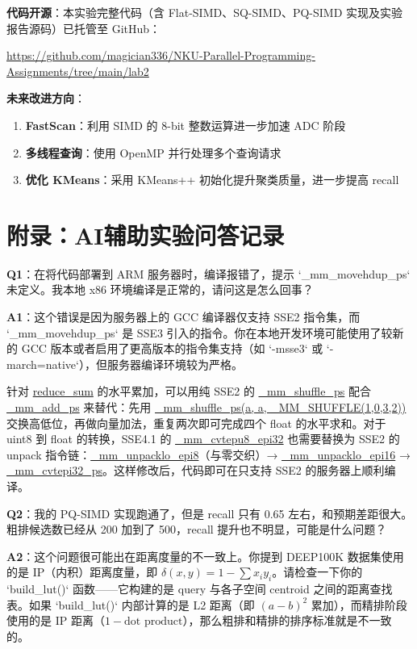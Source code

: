 \documentclass[a4paper]{article}
\begin{document}
\textbf{代码开源}：本实验完整代码（含 Flat-SIMD、SQ-SIMD、PQ-SIMD 实现及实验报告源码）已托管至 GitHub：
\begin{center}
\url{https://github.com/magician336/NKU-Parallel-Programming-Assignments/tree/main/lab2}
\end{center}

\textbf{未来改进方向}：
\begin{enumerate}
  \item \textbf{FastScan}：利用 SIMD 的 8-bit 整数运算进一步加速 ADC 阶段
  \item \textbf{多线程查询}：使用 OpenMP 并行处理多个查询请求
  \item \textbf{优化 KMeans}：采用 KMeans++ 初始化提升聚类质量，进一步提高 recall
\end{enumerate}

\appendix
\section*{附录：AI辅助实验问答记录}

\textbf{Q1}：在将代码部署到 ARM 服务器时，编译报错了，提示 `_mm_movehdup_ps` 未定义。我本地 x86 环境编译是正常的，请问这是怎么回事？

\textbf{A1}：这个错误是因为服务器上的 GCC 编译器仅支持 SSE2 指令集，而 `_mm_movehdup_ps` 是 SSE3 引入的指令。你在本地开发环境可能使用了较新的 GCC 版本或者启用了更高版本的指令集支持（如 `-msse3` 或 `-march=native`），但服务器编译环境较为严格。

针对 \url{reduce_sum} 的水平累加，可以用纯 SSE2 的 \url{_mm_shuffle_ps} 配合 \url{_mm_add_ps} 来替代：先用 \url{_mm_shuffle_ps(a, a, _MM_SHUFFLE(1,0,3,2))} 交换高低位，再做向量加法，重复两次即可完成四个 float 的水平求和。对于 uint8 到 float 的转换，SSE4.1 的 \url{_mm_cvtepu8_epi32} 也需要替换为 SSE2 的 unpack 指令链：\url{_mm_unpacklo_epi8}（与零交织）→ \url{_mm_unpacklo_epi16} → \url{_mm_cvtepi32_ps}。这样修改后，代码即可在只支持 SSE2 的服务器上顺利编译。

\textbf{Q2}：我的 PQ-SIMD 实现跑通了，但是 recall 只有 0.65 左右，和预期差距很大。粗排候选数已经从 200 加到了 500，recall 提升也不明显，可能是什么问题？

\textbf{A2}：这个问题很可能出在距离度量的不一致上。你提到 DEEP100K 数据集使用的是 IP（内积）距离度量，即 $\delta(x,y) = 1 - \sum x_i y_i$。请检查一下你的 `build_lut()` 函数——它构建的是 query 与各子空间 centroid 之间的距离查找表。如果 `build_lut()` 内部计算的是 L2 距离（即 $(a-b)^2$ 累加），而精排阶段使用的是 IP 距离（$1 - \text{dot product}$），那么粗排和精排的排序标准就是不一致的。
\end{document}
